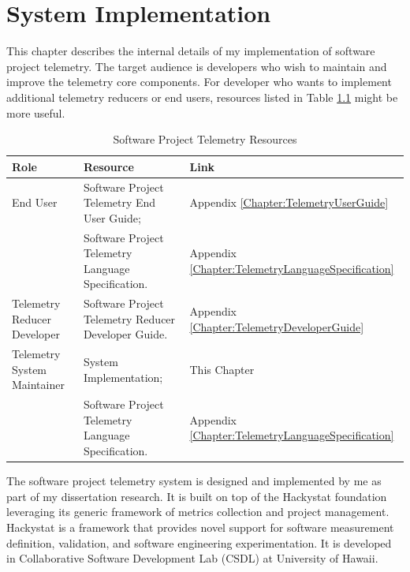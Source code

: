 \chapter{System Implementation}  \label{Chapter:Implementation}


This chapter describes the internal details of my implementation of software project telemetry. The target audience is developers who wish to maintain and improve the telemetry core components. For developer who wants to implement additional telemetry reducers or end users, resources listed in Table \ref{table:Telemetry-User-Role-Resources} might be more useful.

\begin{table}[tbp]
	\centering
		\begin{tabular}{|p{}|p{}|p{}|} 
			\hline
			\textbf{Role} & \textbf{Resource} & \textbf{Link}\\
			
			\hline
			End User & Software Project Telemetry End User Guide; & Appendix \ref{Chapter:TelemetryUserGuide}\\
      {} & Software Project Telemetry Language Specification. & Appendix \ref{Chapter:TelemetryLanguageSpecification}\\
			          
			\hline
		  Telemetry Reducer Developer & Software Project Telemetry Reducer Developer Guide. & Appendix \ref{Chapter:TelemetryDeveloperGuide}\\
		 
			\hline
			Telemetry System Maintainer & System Implementation; & This Chapter\\
			{} & Software Project Telemetry Language Specification. & Appendix \ref{Chapter:TelemetryLanguageSpecification} \\
		
			\hline
		\end{tabular}
	\caption{Software Project Telemetry Resources}
	\label{table:Telemetry-User-Role-Resources}
\end{table}


The software project telemetry system is designed and implemented by me as part of my dissertation research. It is built on top of the Hackystat foundation leveraging its generic framework of metrics collection and project management. Hackystat is a framework that provides novel support for software measurement definition, validation, and software engineering experimentation. It is developed in Collaborative Software Development Lab (CSDL) at University of Hawaii. %

